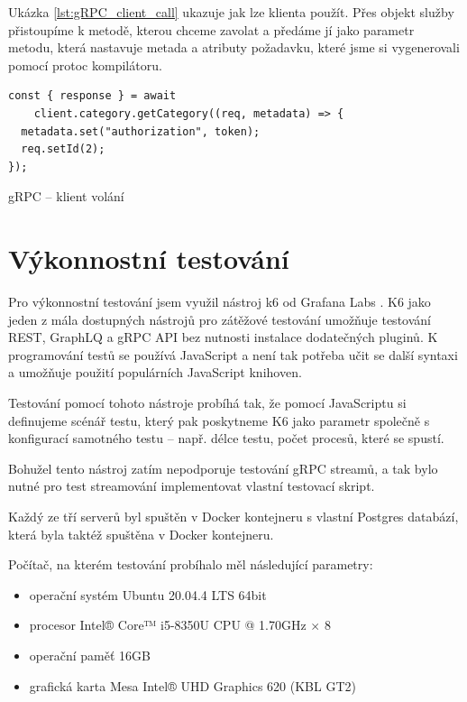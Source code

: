 \documentclass[thesis=M,czech]{FITthesis}[2019/12/23]
\begin{document}
Ukázka \ref{lst:gRPC_client_call} ukazuje jak lze klienta použít. Přes objekt služby přistoupíme k metodě, kterou chceme zavolat a předáme jí jako parametr metodu, která nastavuje metada a atributy požadavku, které jsme si vygenerovali pomocí protoc kompilátoru.

\begin{listing}[H]
\begin{verbatim}
const { response } = await 
    client.category.getCategory((req, metadata) => {
  metadata.set("authorization", token);
  req.setId(2);
});
\end{verbatim}
\caption{gRPC -- klient volání}
\label{lst:gRPC_client_call}
\end{listing}

\chapter{Výkonnostní testování}
Pro výkonnostní testování jsem využil nástroj k6 od Grafana Labs \cite{k6}. K6 jako jeden z mála dostupných nástrojů pro zátěžové testování umožňuje testování REST, GraphLQ a gRPC API bez nutnosti instalace dodatečných pluginů. K programování testů se používá JavaScript a není tak potřeba učit se další syntaxi a umožňuje použití populárních JavaScript knihoven.

Testování pomocí tohoto nástroje probíhá tak, že pomocí JavaScriptu si definujeme scénář testu, který pak poskytneme K6 jako parametr společně s konfigurací samotného testu -- např. délce testu, počet procesů, které se spustí.

Bohužel tento nástroj zatím nepodporuje testování gRPC streamů, a tak bylo nutné pro test streamování implementovat vlastní testovací skript.

Každý ze tří serverů byl spuštěn v Docker kontejneru s vlastní Postgres databází, která byla taktéž spuštěna v Docker kontejneru.

Počítač, na kterém testování probíhalo měl následující parametry:

\begin{itemize}
  \item operační systém Ubuntu 20.04.4 LTS 64bit
  \item procesor Intel® Core™ i5-8350U CPU @ 1.70GHz $\times$  8 
  \item operační paměť 16GB
  \item grafická karta Mesa Intel® UHD Graphics 620 (KBL GT2)
\end{itemize}
\end{document}
